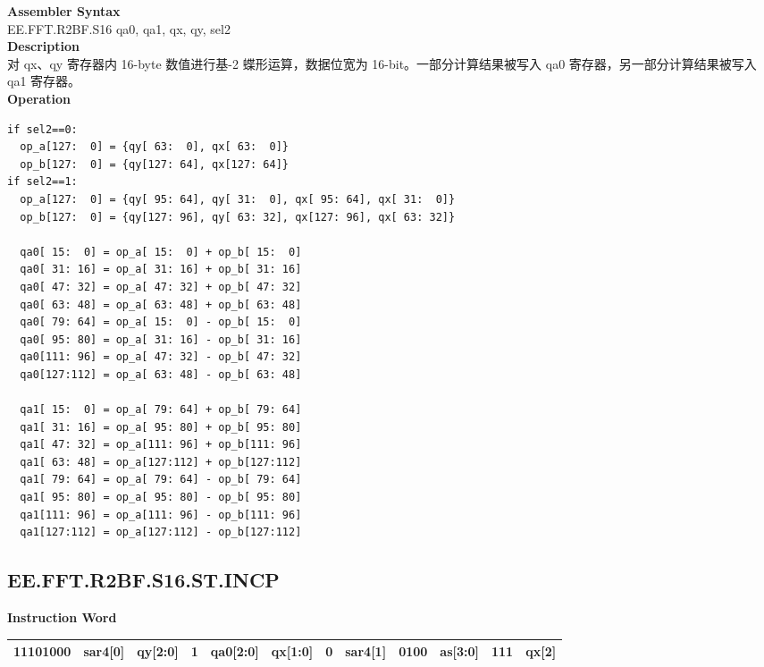 \textbf{Assembler Syntax} \\
EE.FFT.R2BF.S16 qa0, qa1, qx, qy, sel2 \\
\textbf{Description} \\
对 qx、qy 寄存器内 16-byte 数值进行基-2 蝶形运算，数据位宽为 16-bit。一部分计算结果被写入 qa0 寄存器，另一部分计算结果被写入 qa1 寄存器。\\
\textbf{Operation}
\begin{lstlisting}
if sel2==0:
  op_a[127:  0] = {qy[ 63:  0], qx[ 63:  0]}
  op_b[127:  0] = {qy[127: 64], qx[127: 64]}
if sel2==1:
  op_a[127:  0] = {qy[ 95: 64], qy[ 31:  0], qx[ 95: 64], qx[ 31:  0]}
  op_b[127:  0] = {qy[127: 96], qy[ 63: 32], qx[127: 96], qx[ 63: 32]}

  qa0[ 15:  0] = op_a[ 15:  0] + op_b[ 15:  0]
  qa0[ 31: 16] = op_a[ 31: 16] + op_b[ 31: 16]
  qa0[ 47: 32] = op_a[ 47: 32] + op_b[ 47: 32]
  qa0[ 63: 48] = op_a[ 63: 48] + op_b[ 63: 48]
  qa0[ 79: 64] = op_a[ 15:  0] - op_b[ 15:  0]
  qa0[ 95: 80] = op_a[ 31: 16] - op_b[ 31: 16]
  qa0[111: 96] = op_a[ 47: 32] - op_b[ 47: 32]
  qa0[127:112] = op_a[ 63: 48] - op_b[ 63: 48]

  qa1[ 15:  0] = op_a[ 79: 64] + op_b[ 79: 64]
  qa1[ 31: 16] = op_a[ 95: 80] + op_b[ 95: 80]
  qa1[ 47: 32] = op_a[111: 96] + op_b[111: 96]
  qa1[ 63: 48] = op_a[127:112] + op_b[127:112]
  qa1[ 79: 64] = op_a[ 79: 64] - op_b[ 79: 64]
  qa1[ 95: 80] = op_a[ 95: 80] - op_b[ 95: 80]
  qa1[111: 96] = op_a[111: 96] - op_b[111: 96]
  qa1[127:112] = op_a[127:112] - op_b[127:112]
\end{lstlisting}

\clearpage
\subsection{EE.FFT.R2BF.S16.ST.INCP}\label{instruction:EEFFTR2BFS16STINCP}
\setlength\tabcolsep{6pt}
\textbf{Instruction Word} \\
\begin{tabular}{|c|c|c|c|c|c|c|c|c|c|c|c|}
	\hline
	11101000 & sar4[0] & qy[2:0] & 1 & qa0[2:0] & qx[1:0] & 0 & sar4[1] & 0100 & as[3:0] & 111 & qx[2] \\
	\hline
\end{tabular}

